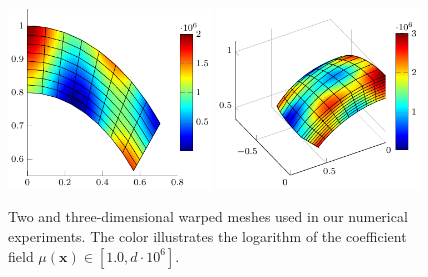 \documentclass[smallcondensed,final]{svjour3}     %
\newcommand{\bs}[1]{\ensuremath{\boldsymbol #1}}
\begin{document}
\begin{figure}
	\includegraphics[width=0.48\textwidth]{figs/fan2d}
	\includegraphics[width=0.48\textwidth]{figs/fan3d}
	\caption{\label{fig:mesh} Two and three-dimensional warped
          meshes used in our numerical experiments. The color
          illustrates the logarithm of the coefficient field $\mu(\bs x)\in [1.0,
            d\cdot 10^6]$.}
\end{figure}
\end{document}
